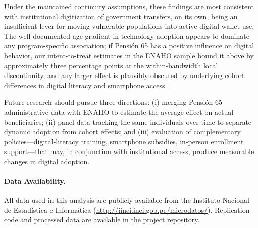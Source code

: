 \documentclass[12pt]{article}
\begin{document}
Under the maintained continuity assumptions, these findings are most consistent with institutional digitization of government transfers, on its own, being an insufficient lever for moving vulnerable populations into active digital wallet use. The well-documented age gradient in technology adoption appears to dominate any program-specific association; if Pensi\'on 65 has a positive influence on digital behavior, our intent-to-treat estimates in the ENAHO sample bound it above by approximately three percentage points at the within-bandwidth local discontinuity, and any larger effect is plausibly obscured by underlying cohort differences in digital literacy and smartphone access.

Future research should pursue three directions: (i) merging Pensi\'on 65 administrative data with ENAHO to estimate the average effect on actual beneficiaries; (ii) panel data tracking the same individuals over time to separate dynamic adoption from cohort effects; and (iii) evaluation of complementary policies---digital-literacy training, smartphone subsidies, in-person enrollment support---that may, in conjunction with institutional access, produce measurable changes in digital adoption.

\paragraph{Data Availability.}
All data used in this analysis are publicly available from the Instituto Nacional de Estad\'istica e Inform\'atica (\url{http://iinei.inei.gob.pe/microdatos/}). Replication code and processed data are available in the project repository.


\clearpage

\begin{table}[H]
\centering
\caption{Summary Statistics by Age-65 Cutoff}
\label{tab:summary}

\end{table}

\begin{table}[H]
\centering
\caption{Main RDD Estimates: Discontinuity at Age 65 in Digital Wallet Outcomes}
\label{tab:main}

\end{table}

\begin{table}[H]
\centering
\caption{Robustness Checks}
\label{tab:robustness}

\end{table}
\end{document}
